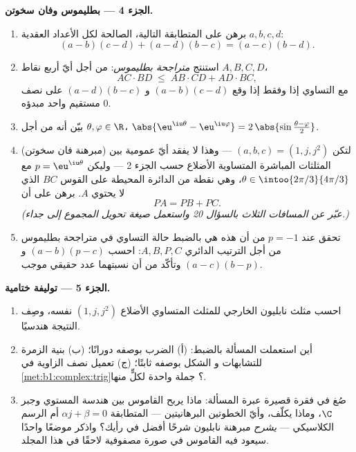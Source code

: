\begin{problem}
\medskip
\noindent\textbf{الجزء 4 --- بطليموس وفان سخوتن.}
\begin{enumerate}[resume]
  \item برهن على المتطابقة التالية، الصالحة لكل الأعداد العقدية
        $a, b, c, d$:
        \[
        (a - b)(c - d) + (a - d)(b - c) = (a - c)(b - d) .
        \]
  \item استنتج \emph{متراجحة بطليموس}: من أجل أيّ أربع نقاط $A, B, C, D$،
        \[
        AC \cdot BD \;\leq\; AB \cdot CD + AD \cdot BC ,
        \]
        مع التساوي إذا وفقط إذا وقع $(a-b)(c-d)$ و
        $(a-d)(b-c)$ على نصف مستقيم واحد مبدؤه $0$.
  \item بيّن أنه من أجل $\theta, \varphi \in \R$،
        $\abs{\eu^{\iu\theta} - \eu^{\iu\varphi}} =
        2\,\abs{\sin\frac{\theta - \varphi}2}$.
  \item (مبرهنة فان سخوتن) لتكن
        $(a, b, c) = (1, j, j^2)$ --- وهذا لا يفقد أيّ
        عمومية بين المثلثات المباشرة المتساوية الأضلاع حسب الجزء 2 ---
        وليكن $p = \eu^{\iu\theta}$ مع $\theta \in
        \intoo{2\pi/3}{4\pi/3}$، وهي نقطة من الدائرة المحيطة على
        القوس $BC$ الذي لا يحتوي $A$. برهن على أن
        \[
        PA = PB + PC .
        \]
        \emph{(عبّر عن المسافات الثلاث بالسؤال 20 واستعمل
        صيغة تحويل المجموع إلى جداء.)}
  \item تحقق عند $p = -1$ من أن هذه هي بالضبط حالة التساوي
        في متراجحة بطليموس من أجل الترتيب الدائري $A, B, P, C$:
        احسب $(a - b)(p - c)$ و $(a - c)(b - p)$ وتأكّد
        من أن نسبتهما عدد حقيقي موجب.
\end{enumerate}

\medskip
\noindent\textbf{الجزء 5 --- توليفة ختامية.}
\begin{enumerate}[resume]
  \item احسب مثلث نابليون الخارجي للمثلث المتساوي الأضلاع
        $(1, j, j^2)$ نفسه، وصِف النتيجة
        هندسيًا.
  \item أين استعملت المسألة بالضبط: (أ) الضرب بوصفه
        دورانًا؛ (ب) بنية الزمرة للتشابهات و
        الشكل بوصفه ثابتًا؛ (ج) تعميل نصف الزاوية في
        \cref{met:b1:complex:trig}؟ جملة واحدة لكلٍّ منها.
  \item صُغ في فقرة قصيرة عبرة المسألة:
        ماذا يربح القاموس بين هندسة المستوي وجبر
        $\C$، وماذا يكلّف، وأيّ الخطوتين البرهانيتين --- المتطابقة
        $\alpha j + \beta = 0$ أم الرسم الكلاسيكي ---
        \emph{يشرح} مبرهنة نابليون شرحًا أفضل في رأيك؟ واذكر
        موضعًا واحدًا سيعود فيه القاموس في صورة مصفوفية لاحقًا في
        هذا المجلد.
\end{enumerate}
\end{problem}
